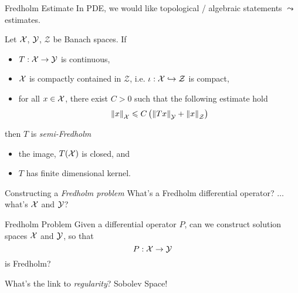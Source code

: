 \documentclass{beamer}
\begin{document}
\begin{frame}{Fredholm Estimate}
In PDE, we would like  topological / algebraic statements $\leadsto$ estimates. 
\pause
\begin{theorem} \label{theorem: fredholm estimates}
    Let $\X$, $\Y$, $\mathcal{Z}$ be Banach spaces.  If 
    \begin{itemize}
        \item $T : \X \to \Y$ is continuous, 
        \item $\X$ is compactly contained in $\mathcal{Z}$, i.e.  $\iota : \X\hookrightarrow \mathcal{Z}$ is compact, 
        \item for all $x \in \X$, there exist $C > 0$ such that the  following estimate hold
        \begin{align}
        \norm[x]_\X \leq C \brac{\norm[Tx]_\Y + \norm[x]_\mathcal{Z}}
        \end{align}
    \end{itemize}
    then $T$ is \textit{semi-Fredholm}
    \begin{itemize}
        \item the image, $T(\X)$ is closed, and
        \item $T$ has finite dimensional kernel. 
    \end{itemize} 
\end{theorem}


\end{frame} 

\begin{frame}{Constructing a \textit{Fredholm problem}} 
What's a Fredholm differential operator? $\dots $ what's $\X$ and $\Y$? 
\begin{block}{Fredholm Problem}
    Given a differential operator $P$, can we construct solution spaces $\X$ and $ \Y$,  so that $$P : \X \to \Y$$ is Fredholm? 
\end{block}
\pause 

What's the link to \textit{regularity}? Sobolev Space! 

\end{frame} 
\end{document}
